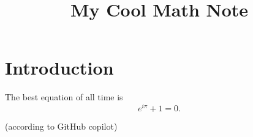 \documentclass[reqno]{amsart} 
\begin{document}
\title{My Cool Math Note}

\section{Introduction}
The best equation of all time is
\begin{equation*}
  e^{i\pi} + 1 = 0.
\end{equation*}

(according to GitHub copilot)

{} 
\end{document}
